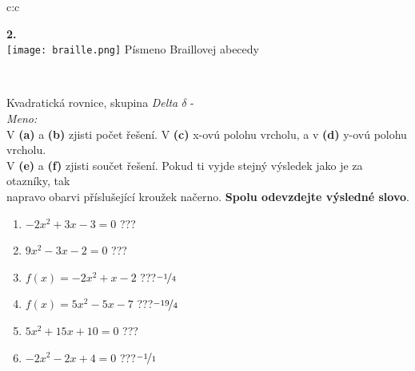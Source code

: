 \documentclass[10pt]{report}
\begin{document}
\begin{tabular}{c:c}
\begin{minipage}[c][99mm][t]{0.49\linewidth}
\begin{center}
\begin{minipage}{0.20\linewidth}
\begin{center}
{\Huge\bfseries 2.} \\[2mm]
\texttt{[image: braille.png]}
{\small Písmeno Braillovej abecedy}
\end{center}
\end{minipage}
\end{center}
\end{minipage}
\\ \hdashline
\begin{minipage}[c][99mm][t]{0.49\linewidth}
\begin{center}
\vspace{7mm}
{\huge Kvadratická rovnice, skupina \textit{Delta $\delta$} -}\\[4.5mm]
\textit{Meno:}\phantom{xxxxxxxxxxxxxxxxxxxxxxxxxxxxxxxxxxxxxxxxxxxxxxxxxxxxxxxxxxxxxxxxx}\\[3.5mm]
V \textbf{(a)} a \textbf{(b)} zjisti počet řešení. V \textbf{(c)} x-ovú polohu vrcholu, a v \textbf{(d)} y-ovú polohu vrcholu.\\V \textbf{(e)} a \textbf{(f)} zjisti součet řešení. Pokud ti vyjde stejný výsledek jako je za otazníky, tak\\napravo obarvi příslušející kroužek načerno. \textbf{Spolu odevzdejte výsledné slovo}.\\[3mm]
\begin{minipage}{0.77\linewidth}
\begin{center}
\begin{varwidth}{\textwidth}
\begin{enumerate}
\large
\item $-2x^2+3x-3=0$\quad \dotfill\; ???\;\dotfill {}
\item $9x^2-3x-2=0$\quad \dotfill\; ???\;\dotfill {}
\item $f(x)=-2x^2+x-2$\quad \dotfill\; ???\;\dotfill \quad $\nicefrac{-1}{4}$
\item $f(x)=5x^2-5x-7$\quad \dotfill\; ???\;\dotfill \quad $\nicefrac{-19}{4}$
\item $5x^2+15x+10=0$\quad \dotfill\; ???\;\dotfill {}
\item $-2x^2-2x+4=0$\quad \dotfill\; ???\;\dotfill \quad $\nicefrac{-1}{1}$
\end{enumerate}
\end{varwidth}
\end{center}
\end{minipage}
\begin{minipage}{0.20\linewidth}
\begin{center}

\end{center}
\end{minipage}
\end{center}
\end{minipage}
\end{tabular}
\end{document}
